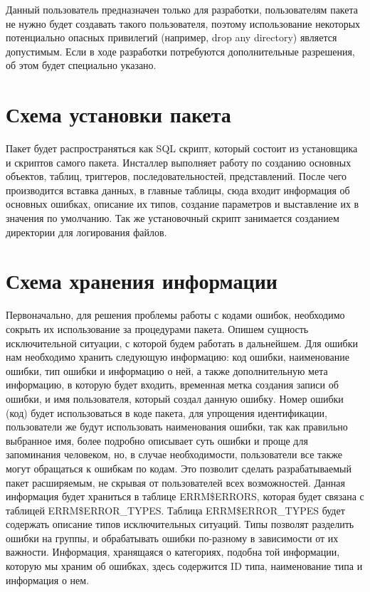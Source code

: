 Данный пользователь предназначен только для разработки, пользователям пакета не нужно будет создавать такого пользователя, поэтому использование некоторых потенциально опасных привилегий (например, drop any directory) является допустимым. Если в ходе разработки потребуются дополнительные разрешения, об этом будет специально указано.


\section{Схема установки пакета} \label{ch3:sec2}

Пакет будет распространяться как SQL скрипт, который состоит из установщика и скриптов самого пакета. Инсталлер выполняет работу по созданию основных объектов, таблиц, триггеров, последовательностей, представлений. После чего производится вставка данных, в главные таблицы, сюда входит информация об основных ошибках, описание их типов, создание параметров и выставление их в значения по умолчанию. Так же установочный скрипт занимается созданием директории для логирования файлов.


\section{Схема хранения информации} \label{ch3:sec3}

Первоначально, для решения проблемы работы с кодами ошибок, необходимо сокрыть их использование за процедурами пакета. Опишем сущность исключительной ситуации, с которой будем работать в дальнейшем. Для ошибки нам необходимо хранить следующую информацию: код ошибки, наименование ошибки, тип ошибки и информацию о ней, а также дополнительную мета информацию, в которую будет входить, временная метка создания записи об ошибки, и имя пользователя, который создал данную ошибку. Номер ошибки (код) будет использоваться в коде пакета, для упрощения идентификации, пользователи же будут использовать наименования ошибки, так как правильно выбранное имя, более подробно описывает суть ошибки и проще для запоминания человеком, но, в случае необходимости, пользователи все также могут обращаться к ошибкам по кодам. Это позволит сделать разрабатываемый пакет расширяемым, не скрывая от пользователей всех возможностей. Данная информация будет храниться в таблице ERRM\$ERRORS, которая будет связана с таблицей ERRM\$ERROR\_TYPES. Таблица ERRM\$ERROR\_TYPES будет содержать описание типов исключительных ситуаций. Типы позволят разделить ошибки на группы, и обрабатывать ошибки по-разному в зависимости от их важности. Информация, хранящаяся о категориях, подобна той информации, которую мы храним об ошибках, здесь содержится ID типа, наименование типа и информация о нем. 

